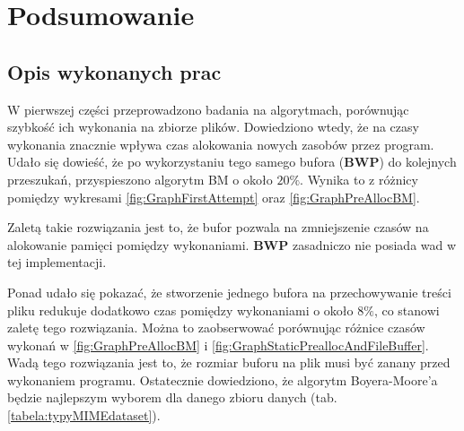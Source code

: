 
\chapter{Podsumowanie}



\section{Opis wykonanych prac}

W pierwszej części przeprowadzono badania na algorytmach, porównując szybkość
ich wykonania na zbiorze plików. Dowiedziono wtedy, że na czasy wykonania 
znacznie wpływa czas alokowania nowych zasobów przez program. Udało się dowieść,
że po wykorzystaniu tego samego bufora (\textbf{BWP}) do kolejnych przeszukań, przyspieszono 
algorytm BM o około $20 \%$. Wynika to z różnicy pomiędzy
wykresami \ref{fig:GraphFirstAttempt} oraz \ref{fig:GraphPreAllocBM}.

Zaletą takie rozwiązania jest to, że bufor pozwala na zmniejszenie czasów
na alokowanie pamięci pomiędzy wykonaniami. \textbf{BWP} zasadniczo nie posiada wad w
tej implementacji. 

Ponad udało się pokazać, że stworzenie jednego bufora na przechowywanie treści
pliku redukuje dodatkowo czas pomiędzy wykonaniami o około $8 \%$, co stanowi
zaletę tego rozwiązania. Można to zaobserwować porównując różnice czasów wykonań
w \ref{fig:GraphPreAllocBM} i \ref{fig:GraphStaticPreallocAndFileBuffer}. Wadą
tego rozwiązania jest to, że rozmiar buforu na plik musi być zanany przed
wykonaniem programu. Ostatecznie dowiedziono, że algorytm Boyera-Moore'a będzie
najlepszym wyborem dla danego zbioru danych (tab. \ref{tabela:typyMIMEdataset}).

